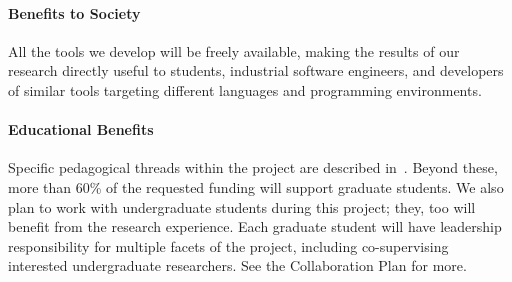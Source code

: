 \paragraph*{Benefits to Society} 
%
All the tools we develop will be freely available, making the results
of our research directly useful to students, industrial software
engineers, and developers of similar tools targeting different
languages and programming environments.

\paragraph*{Educational Benefits}
Specific pedagogical threads within the project are described
in~.  Beyond these, more than
60\%\iflater{}\fi{} of the requested funding will support
graduate students.  We also plan to work with undergraduate students
during this project; they, too will benefit from the research
experience. Each graduate student will have leadership responsibility
for multiple facets of the project, including co-supervising
interested undergraduate researchers.  See the Collaboration Plan for
more. \iflater{}\fi



